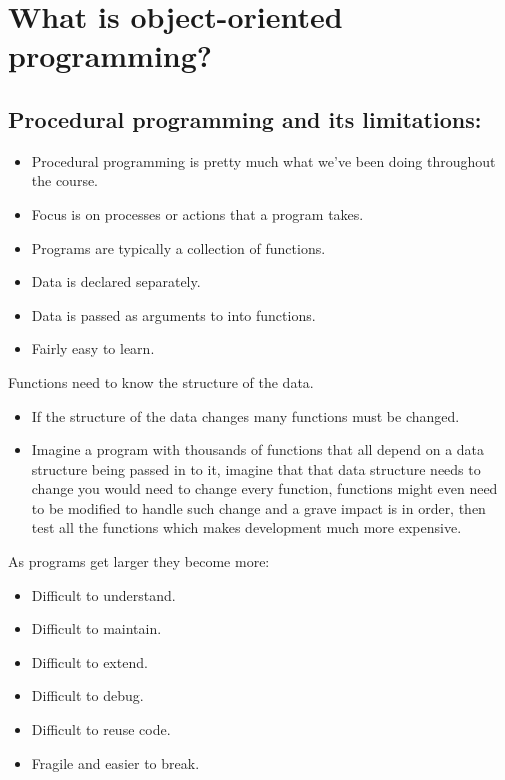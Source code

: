 \section{What is object-oriented programming?}
\subsection{Procedural programming and its limitations:}
\begin{itemize}
    \item Procedural programming is pretty much what we've been doing throughout the course.
    \item Focus is on processes or actions that a program takes.
    \item Programs are typically a collection of functions.
    \item Data is declared separately.
    \item Data is passed as arguments to into functions.
    \item Fairly easy to learn.
\end{itemize}
Functions need to know the structure of the data.
\begin{itemize}
    \item If the structure of the data changes many functions must be changed.
    \item Imagine a program with thousands of functions that all depend on a data structure being passed in to it, imagine that that data structure needs to change you would need to change every function, functions might even need to be modified to handle such change and a grave impact is in order, then test all the functions which makes development much more expensive.
\end{itemize}

As programs get larger they become more:
\begin{itemize}
    \item Difficult to understand.
    \item Difficult to maintain.
    \item Difficult to extend.
    \item Difficult to debug.
    \item Difficult to reuse code.
    \item Fragile and easier to break.
\end{itemize}

